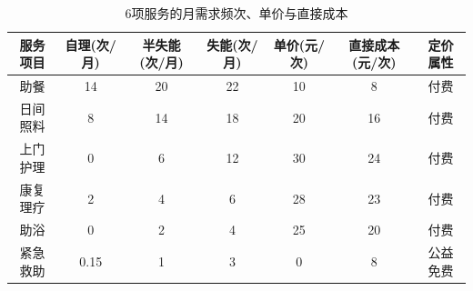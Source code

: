 \begin{table}[h]
\centering
\caption{6项服务的月需求频次、单价与直接成本}
\begin{tabular}{|c|c|c|c|c|c|c|}
\hline
服务项目 & 自理(次/月) & 半失能(次/月) & 失能(次/月) & 单价(元/次) & 直接成本(元/次) & 定价属性 \\
\hline
助餐 & 14 & 20 & 22 & 10 & 8 & 付费 \\
日间照料 & 8 & 14 & 18 & 20 & 16 & 付费 \\
上门护理 & 0 & 6 & 12 & 30 & 24 & 付费 \\
康复理疗 & 2 & 4 & 6 & 28 & 23 & 付费 \\
助浴 & 0 & 2 & 4 & 25 & 20 & 付费 \\
紧急救助 & 0.15 & 1 & 3 & 0 & 8 & 公益免费 \\
\hline
\end{tabular}
\end{table}